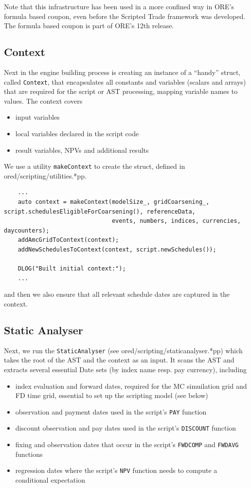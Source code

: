 \documentclass[12pt, a4paper]{report}
\begin{document}
Note that this infrastructure has been used in a more confined way in ORE's formula based
coupon, even before the Scripted Trade framework was developed. The formula based coupon is part of
ORE's 12th release.

\subsection{Context}

Next in the engine building process is creating an instance of a ``handy'' struct, called
{\tt Context}, that encapsulates all constants and variables (scalars and arrays) that are required
for the script or AST processing, mapping variable names to values. The context covers
\begin{itemize}
\item input variables
\item local variables declared in the script code
\item result variables, NPVs and additional results
\end{itemize}
We use a utility {\tt makeContext} to create the struct, defined in
ored/scripting/utilities.*pp.

\begin{verbatim}
    ...
    auto context = makeContext(modelSize_, gridCoarsening_, script.schedulesEligibleForCoarsening(), referenceData,
                               events, numbers, indices, currencies, daycounters);
    addAmcGridToContext(context);
    addNewSchedulesToContext(context, script.newSchedules());

    DLOG("Built initial context:");
    ...
\end{verbatim}

and then we also ensure that all relevant schedule dates are captured in the context.

\subsection{Static Analyser}

Next, we run the {\tt StaticAnalyser} (see ored/scripting/staticanalyser.*pp) which takes the root of
the AST and the context as an input. It scans the AST and extracts several essential Date sets (by
index name resp. pay currency), including
\begin{itemize}
\item index evaluation and forward dates, required for the MC simuilation grid and FD time grid,
  essential to set up the scripting model (see below) 
\item observation and payment dates used in the script's {\tt PAY} function
\item discount observation and pay dates used in the script's {\tt DISCOUNT} function
\item fixing and observation dates that occur in the script's {\tt FWDCOMP} and {\tt FWDAVG} functions
\item regression dates where the script's {\tt NPV} function needs to compute a conditional expectation
\end{itemize}
\end{document}
